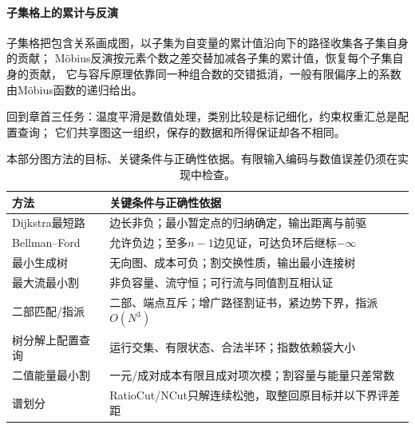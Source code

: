\paragraph{子集格上的累计与反演}
子集格把包含关系画成图，以子集为自变量的累计值沿向下的路径收集各子集自身的贡献；
Möbius反演按元素个数之差交替加减各子集的累计值，恢复每个子集自身的贡献，
它与容斥原理依靠同一种组合数的交错抵消，一般有限偏序上的系数由Möbius函数的递归给出。

回到章首三任务：温度平滑是数值处理，类别比较是标记细化，约束权重汇总是配置查询；
它们共享图这一组织，保存的数据和所得保证却各不相同。

\begin{table}[htbp]
  \centering\small
  \caption{本部分图方法的目标、关键条件与正确性依据。有限输入编码与数值误差仍须在实现中检查。}
  \label{tab:graph-algorithm-conditions}
  \begin{tabularx}{\linewidth}{@{}lX@{}}
    \toprule
    方法 & 关键条件与正确性依据\\
    \midrule
    Dijkstra最短路 & 边长非负；最小暂定点的归纳确定，输出距离与前驱\\
    Bellman--Ford & 允许负边；至多$n-1$边见证，可达负环后继标$-\infty$\\
    最小生成树 & 无向图、成本可负；割交换性质，输出最小连接树\\
    最大流最小割 & 非负容量、流守恒；可行流与同值割互相认证\\
    二部匹配/指派 & 二部、端点互斥；增广路径割证书，紧边势下界，指派$O(N^3)$\\
    树分解上配置查询 & 运行交集、有限状态、合法半环；指数依赖袋大小\\
    二值能量最小割 & 一元/成对成本有限且成对项次模；割容量与能量只差常数\\
    谱划分 & RatioCut/NCut只解连续松弛，取整回原目标并以下界评差距\\
    \bottomrule
  \end{tabularx}
\end{table}
